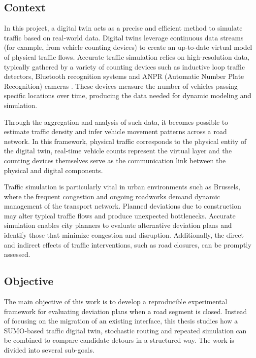 \subsection{Context}

In this project, a digital twin acts as a precise and efficient method to simulate traffic 
based on real-world data. Digital twins leverage continuous data streams (for example, from 
vehicle counting devices) to create an up-to-date virtual model of physical traffic flows. 
Accurate traffic simulation relies on high-resolution data, typically gathered by a variety of counting devices such as inductive loop traffic detectors, Bluetooth recognition systems and ANPR (Automatic Number Plate Recognition) cameras \cite{counting_devices}. These devices measure the number of vehicles passing specific locations over time, producing the data needed for dynamic modeling and simulation.

Through the aggregation and analysis of such data, it becomes possible to estimate traffic density and infer vehicle movement patterns across a road network. In this framework, physical traffic corresponds to the physical entity of the digital twin, real-time vehicle counts represent the virtual layer and the counting devices themselves serve as the communication link between the physical and digital components.

Traffic simulation is particularly vital in urban environments such as Brussels, where the frequent congestion and ongoing roadworks demand dynamic management of the transport network.
Planned deviations due to construction may alter typical traffic flows and produce unexpected bottlenecks. Accurate simulation enables city planners to evaluate alternative deviation plans and identify those that minimize congestion and disruption. Additionally, the direct and indirect effects of traffic interventions, such as road closures, can be promptly assessed.  



\subsection{Objective}
The main objective of this work is to develop a reproducible experimental framework for evaluating deviation plans when a road segment is closed. Instead of focusing on the migration of an existing interface, this thesis studies how a SUMO-based traffic digital twin, stochastic routing and repeated simulation can be combined to compare candidate detours in a structured way. The work is divided into several sub-goals.

